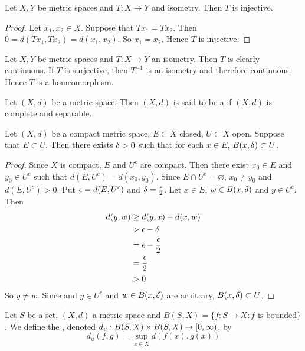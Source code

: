 \documentclass{book}
\begin{document}
\begin{ex} \lex{}
	Let $X,Y$ be metric spaces and $T:X \rightarrow Y$ and isometry. Then $T$ is injective.
\end{ex}

\begin{proof}
	Let $x_1, x_2 \in X$. Suppose that $Tx_1=Tx_2$. Then $0= d( Tx_1, Tx_2) = d(x_1,x_2)$. So $x_1 = x_2$. Hence $T$ is injective.
\end{proof}

\begin{note}
	Let $X,Y$ be metric spaces and $T:X \rightarrow Y$ an isometry. Then $T$ is clearly continuous. If $T$ is surjective, then $T^{-1}$ is an isometry and therefore continuous. Hence $T$ is a homeomorphism.
\end{note}

\begin{defn} \ld{}
	Let $(X,d)$ be a metric space. Then $(X,d)$ is said to be a  if $(X,d)$ is complete and separable. 
\end{defn}



\begin{ex} \lex{}
	Let $(X, d)$ be a compact metric space, $E \subset X$ closed, $U \subset X$ open. Suppose that $E \subset U$. Then there exists $\delta >0$ such that for each $x \in E$, $B(x, \delta) \subset U$.
\end{ex}	

\begin{proof}
	Since $X$ is compact, $E$ and $U^c$ are compact. Then there exist $x_0 \in E$ and $y_0 \in U^c$ such that $d(E, U^c) = d(x_0,y_0)$. Since $E \cap U^c = \varnothing$, $x_0 \neq y_0$ and $d(E, U^c) >0$. Put $\epsilon = d(E, U^c)$ and $\delta = \frac{\epsilon}{2}$.  Let $x \in E$, $w \in B(x, \delta)$ and $y \in U^c$. Then 
	\begin{align*}
		d(y, w) 
		&\geq d(y, x) - d(x, w) \\
		&> \epsilon - \delta \\
		&= \epsilon - \frac{\epsilon}{2} \\
		&= \frac{\epsilon}{2} \\
		&> 0
	\end{align*}	  
	So $y \neq w$. Since and $y \in U^c$ and $w \in B(x, \delta)$ are arbitrary, $B(x, \delta) \subset U$.
\end{proof}

\begin{defn} \ld{}
	Let $S$ be a set, $(X, d)$ a metric space and $B(S, X) = \{f: S \rightarrow X: f \text{ is bounded} \}$. We define the , denoted $d_u:B(S,X) \times B(S,X) \rightarrow [0,\infty)$, by $$d_u(f, g) = \sup_{x \in X}d(f(x), g(x)) $$ 
\end{defn}
\end{document}
